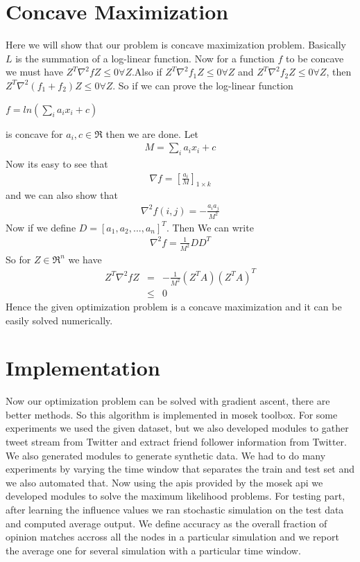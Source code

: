 \section*{Concave Maximization}
Here we will show that our problem is concave maximization problem. Basically $L$ is the summation of a log-linear function. Now for a function $f$ to be concave we must have $Z^{T}\nabla^{2}fZ \leq 0 \forall Z$.Also if $Z^{T}\nabla^{2}f_{1}Z \leq 0 \forall Z$ and $Z^{T}\nabla^{2}f_{2}Z \leq 0 \forall Z$, then $Z^{T}\nabla^{2}(f_{1}+f_{2})Z \leq 0 \forall Z$. So if we can prove the log-linear function \\
\begin{center}
$f = ln(\displaystyle\sum_{i}a_{i}x_{i} + c)$
\end{center}  is concave for $a_i,c \in \Re$ then we are done. Let 
\begin{eqnarray*}
M = \displaystyle\sum_{i}a_{i}x_{i} + c \nonumber
\end{eqnarray*}
Now its easy to see that
\begin{eqnarray*}
\nabla f = [\frac{a_i}{M}]_{1 \times k}
\end{eqnarray*}
and we can also show that
\begin{eqnarray*}
\nabla^2 f (i,j) = -\frac{a_ia_j}{M^2}
\end{eqnarray*}
Now if we define $D = [a_1,a_2,...,a_n]^T$. Then We can write 
\begin{eqnarray*}
\nabla^2 f = \frac{1}{M^2} DD^T
\end{eqnarray*}
So for $Z \in \Re^n$ we have 
\begin{eqnarray*}
Z^{T}\nabla^{2}fZ &=& -\frac{1}{M^2} (Z^TA)(Z^TA)^T \\ 
				  &\leq& 0
\end{eqnarray*}
Hence the given optimization problem is a concave maximization and it can be easily solved numerically.
\section*{Implementation}
Now our optimization problem can be solved with gradient ascent, there are better methods. So this algorithm is implemented in mosek toolbox. For some experiments we used the given dataset, but we also developed modules to gather tweet stream from Twitter and extract friend follower information from Twitter. We also generated modules to generate synthetic data. We had to do many experiments by varying the time window that separates the train and test set and we also automated that. Now using the apis provided by the mosek api we developed modules to solve the maximum likelihood problems. For testing part, after learning the influence values we ran stochastic simulation on the test data and computed average output. We define accuracy as the overall fraction of opinion matches accross all the nodes in a particular simulation and we report the average one for several simulation with a particular time window.
